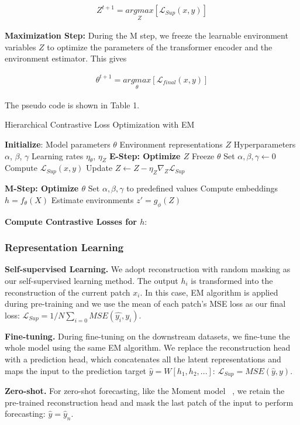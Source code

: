 \begin{align}
    Z^{t+1} = \underset{Z}{argmax}[\mathcal{L}_{Sup}(x, y)] \tag{8}
\end{align}


\textbf{Maximization Step:} During the M step, we freeze the learnable environment variables $Z$ to optimize the parameters of the transformer encoder and the environment estimator. This gives 

\begin{align}
    \theta^{t+1} = \underset{\theta}{argmax}[\mathcal{L}_{final}(x, y)] \tag{9}
\end{align}

The pseudo code is shown in Table 1.

\begin{algorithm}
\small
\caption{Hierarchical Contrastive Loss Optimization with EM}
\label{alg:hierarchical_contrastive_em}
\begin{algorithmic}[1]
\State \textbf{Initialize}:
\State \quad Model parameters $\theta$
\State \quad Environment representations $Z$
\State \quad Hyperparameters $\alpha$, $\beta$, $\gamma$
\State \quad Learning rates $\eta_\theta$, $\eta_Z$
\Repeat
    \State \textbf{E-Step: Optimize $Z$}
    \State \quad Freeze $\theta$
    \State \quad Set $\alpha, \beta, \gamma \gets 0$
    \State \quad Compute $\mathcal{L}_{Sup}(x, y)$
    \State \quad Update $Z \gets Z - \eta_Z \nabla_Z \mathcal{L}_{Sup}$
    
    \State \textbf{M-Step: Optimize $\theta$}
    \State \quad Set $\alpha, \beta, \gamma$ to predefined values
    \State \quad Compute embeddings $h = f_\theta(X)$
    \State \quad Estimate environments $z' = g_\phi(Z)$
    
    \State \quad \textbf{Compute Contrastive Losses for $h$}:
\end{algorithmic}
\end{algorithm}

\subsubsection{Representation Learning}

\textbf{Self-supervised Learning.} We adopt reconstruction with random masking as our self-supervised learning method. The output $h_i$ is transformed into the reconstruction of the current patch $x_i$. In this case, EM algorithm is applied during pre-training and we use the mean of each patch's MSE loss as our final loss: $\mathcal{L}_{Sup} = 1/N \sum_{i=0} MSE(\hat{y_i}, y_i)$.


\textbf{Fine-tuning.} During fine-tuning on the downstream datasets, we fine-tune the whole model using the same EM algorithm. We replace the reconstruction head with a prediction head, which concatenates all the latent representations and maps the input to the prediction target $\hat{y}=W[h_1, h_2, ...]$: $\mathcal{L}_{Sup} = MSE(\hat{y}, y)$.


\textbf{Zero-shot.} For zero-shot forecasting, like the Moment model ~\cite{}, we retain the pre-trained reconstruction head and mask the last patch of the input to perform forecasting: $\hat{y} = \hat{y}_n$.




